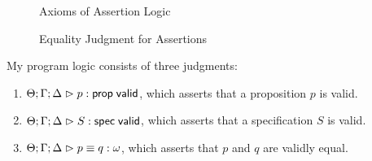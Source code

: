 \begin{figure}
\caption{Axioms of Assertion Logic}
\label{assertion-logic-axioms}  
\end{figure}

\begin{figure}
\caption{Equality Judgment for Assertions}
\label{assertion-equality}  
\end{figure}


My program logic consists of three judgments:

\begin{enumerate}
\item ${\Theta; \Gamma; \Delta} \vartriangleright {p} : \mathsf{prop} \;\mathsf{valid}$, which asserts that a proposition $p$ is valid.

\item ${\Theta; \Gamma; \Delta} \vartriangleright {S} : \mathsf{spec} \;\mathsf{valid}$, which asserts that a specification $S$ is valid.

\item ${\Theta; \Gamma; \Delta} \vartriangleright {p} \equiv {q} : {\omega}$, which asserts that $p$ and $q$ are validly equal.
\end{enumerate}
%

